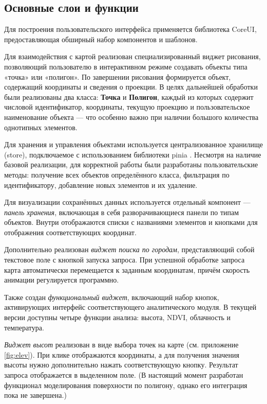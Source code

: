 \subsection*{Основные слои и функции}

Для построения пользовательского интерфейса применяется библиотека CoreUI\cite{CoreUI2023}, предоставляющая обширный набор компонентов и шаблонов.

Для взаимодействия с картой реализован специализированный виджет рисования, позволяющий пользователю в интерактивном режиме создавать объекты типа «точка» или «полигон». По завершении рисования формируется объект, содержащий координаты и сведения о проекции. В целях дальнейшей обработки были реализованы два класса: \textbf{Точка} и \textbf{Полигон}, каждый из которых содержит числовой идентификатор, координаты, текущую проекцию и пользовательское наименование объекта — что особенно важно при наличии большого количества однотипных элементов.

Для хранения и управления объектами используется централизованное хранилище (store), подключаемое с использованием библиотеки pinia \cite{Pinia2023}. Несмотря на наличие базовой реализации, для корректной работы были разработаны пользовательские методы: получение всех объектов определённого класса, фильтрация по идентификатору, добавление новых элементов и их удаление.

Для визуализации сохранённых данных используется отдельный компонент — \textit{панель хранения}, включающая в себя разворачивающиеся панели по типам объектов. Внутри отображаются списки с названиями элементов и кнопками для отображения соответствующих координат.

Дополнительно реализован \textit{виджет поиска по городам}, представляющий собой текстовое поле с кнопкой запуска запроса. При успешной обработке запроса карта автоматически перемещается к заданным координатам, причём скорость анимации регулируется программно.

Также создан \textit{функциональный виджет}, включающий набор кнопок, активирующих интерфейс соответствующего аналитического модуля. В текущей версии доступны четыре функции анализа: высота, NDVI, облачность и температура.


\textit{Виджет высот} реализован в виде выбора точек на карте (см. приложение \ref{fig:elev}). При клике отображаются координаты, а для получения значения высоты нужно дополнительно нажать соответствующую кнопку. Результат запроса отображается в выделенном поле. (В настоящий момент разработан функционал моделирования поверхности по полигону, однако его интеграция пока не завершена.)

